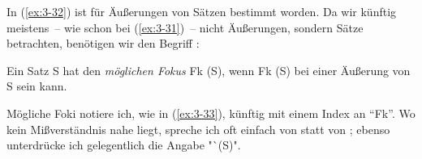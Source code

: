 \documentclass[output=paper]{langsci/langscibook}
\begin{document}
In (\ref{ex:3-32}) ist  für Äußerungen von Sätzen bestimmt
worden. Da wir künftig meistens~-- wie schon bei (\ref{ex:3-31})~-- nicht
Äußerungen, sondern Sätze betrachten, benötigen wir den Begriff
:
\begin{exe}
	\ex\label{ex:3-33}
Ein Satz S hat den \textit{möglichen Fokus} Fk (S), wenn Fk (S) bei einer
Äußerung von S  sein kann.
\end{exe}
Mögliche Foki notiere ich, wie in (\ref{ex:3-33}), künftig mit einem Index an
"`Fk"'. Wo kein Mißverständnis nahe liegt, spreche ich oft einfach von
 statt von ; ebenso unterdrücke
ich gelegentlich die Angabe "`(S)".
\end{document}
